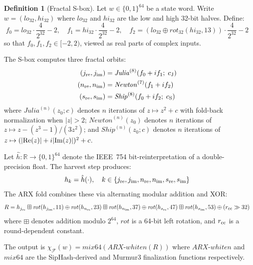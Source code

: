 \documentclass[11pt]{article}
\theoremstyle{definition}
\newtheorem{definition}[theorem]{Definition}
\theoremstyle{remark}
\newcommand{\sbox}{\chi_{\mathcal{F}}} %
\newcommand{\bits}{\{0,1\}}
\begin{document}
\begin{definition}[Fractal S-box]
\label{def:sbox}
Let $w \in \bits^{64}$ be a state word. Write $w = (\mathit{lo}_{32}, \mathit{hi}_{32})$
where $\mathit{lo}_{32}$ and $\mathit{hi}_{32}$ are the low and high 32-bit halves.
Define:
\[
    f_0 = \mathit{lo}_{32} \cdot \frac{4}{2^{32}} - 2, \quad
    f_1 = \mathit{hi}_{32} \cdot \frac{4}{2^{32}} - 2, \quad
    f_2 = (\mathit{lo}_{32} \oplus \mathit{rot}_{32}(\mathit{hi}_{32}, 13)) \cdot \frac{4}{2^{32}} - 2
\]
so that $f_0, f_1, f_2 \in [-2, 2)$, viewed as real parts of complex inputs.

The S-box computes three fractal orbits:
\begin{align*}
    (j_{\rm re}, j_{\rm im}) &= \mathit{Julia}^{(8)}(f_0 + if_1;\; c_{\rm J}) \\
    (n_{\rm re}, n_{\rm im}) &= \mathit{Newton}^{(7)}(f_1 + if_2) \\
    (s_{\rm re}, s_{\rm im}) &= \mathit{Ship}^{(8)}(f_0 + if_2;\; c_{\rm S})
\end{align*}
where $\mathit{Julia}^{(n)}(z_0; c)$ denotes $n$ iterations of $z \mapsto z^2 + c$
with fold-back normalization when $|z| > 2$; $\mathit{Newton}^{(n)}(z_0)$ denotes
$n$ iterations of $z \mapsto z - (z^3-1)/(3z^2)$; and $\mathit{Ship}^{(n)}(z_0; c)$
denotes $n$ iterations of $z \mapsto (|{\rm Re}(z)| + i|{\rm Im}(z)|)^2 + c$.

Let $\hat{h} : \mathbb{R} \to \bits^{64}$ denote the IEEE~754 bit-reinterpretation
of a double-precision float. The harvest step produces:
\[
    h_k = \hat{h}(\cdot), \quad k \in \{j_{\rm re}, j_{\rm im}, n_{\rm re}, n_{\rm im}, s_{\rm re}, s_{\rm im}\}
\]
The ARX fold combines these via alternating modular addition and XOR:
\[
    R = h_{j_{\rm re}} \boxplus \mathit{rot}(h_{j_{\rm im}}, 11) \oplus \mathit{rot}(h_{n_{\rm re}}, 23)
        \boxplus \mathit{rot}(h_{n_{\rm im}}, 37) \oplus \mathit{rot}(h_{s_{\rm re}}, 47)
        \boxplus \mathit{rot}(h_{s_{\rm im}}, 53) \oplus (r_{\rm cc} \gg 32)
\]
where $\boxplus$ denotes addition modulo $2^{64}$, $\mathit{rot}$ is a 64-bit
left rotation, and $r_{\rm cc}$ is a round-dependent constant.

The output is $\sbox(w) = \mathit{mix64}(\mathit{ARX\text{-}whiten}(R))$ where
$\mathit{ARX\text{-}whiten}$ and $\mathit{mix64}$ are the SipHash-derived and
Murmur3 finalization functions respectively.
\end{definition}

\end{document}

